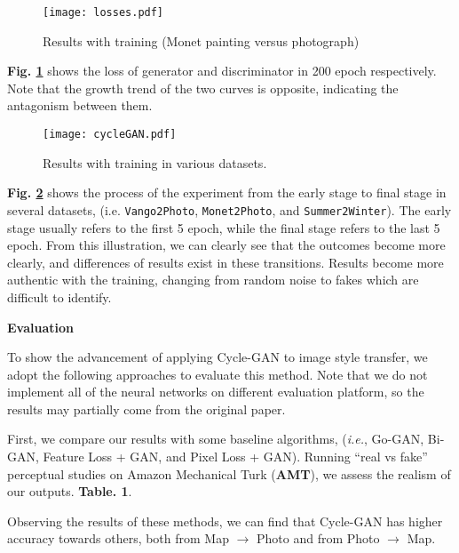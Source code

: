 \documentclass[a4paper]{article}
\begin{document}
\large{

\vspace{3mm}
\begin{figure}[h]
\centering
\texttt{[image: losses.pdf]}
\caption{Results with training (Monet painting versus photograph)}
\label{losses}
\end{figure}
\vspace{2mm}

\textbf{Fig. \ref{losses} }shows the loss of generator and discriminator in 200 epoch respectively. Note that the growth trend of the two curves is opposite, indicating the antagonism between them.


\vspace{3mm}
\begin{figure}[h]
\centering
\texttt{[image: cycleGAN.pdf]}
\caption{Results with training in various datasets.}
\label{moreresults}
\end{figure}
\vspace{2mm}

\large\textbf{Fig. \ref{moreresults}} shows the process of the experiment from the early stage to final stage in several datasets, (i.e. \texttt{Vango2Photo}, \texttt{Monet2Photo}, and \texttt{Summer2Winter}). The early stage usually refers to the first 5 epoch, while the final stage refers to the last 5 epoch. From this illustration, we can clearly see that the outcomes become more clearly, and differences of results exist in these transitions. Results become more authentic with the training, changing from random noise to fakes which are difficult to identify. 
} 

\vspace{2mm}
\begin{center}
\large\textbf{Evaluation} \\
\end{center}

\large{To show the advancement of applying \textsf{Cycle-GAN} to image style transfer, we adopt the following approaches to evaluate this method. Note that we do not implement all of the neural networks on different evaluation platform, so the results may partially come from the original paper. 

First, we compare our results with some baseline algorithms, (\textit{i.e.}, \textsf{Go-GAN}, \textsf{Bi-GAN}, \textsf{Feature Loss} + \textsf{GAN}, and \textsf{Pixel Loss} + \textsf{GAN}). Running “real vs fake” perceptual studies on Amazon Mechanical Turk (\textbf{AMT}), we assess the realism of our outputs. \textbf{Table. 1}.} Observing the results of these methods, we can find that \textsf{Cycle-GAN} has higher accuracy towards others, both from Map $\to$ Photo and from Photo $\to$ Map. 
\end{document}
